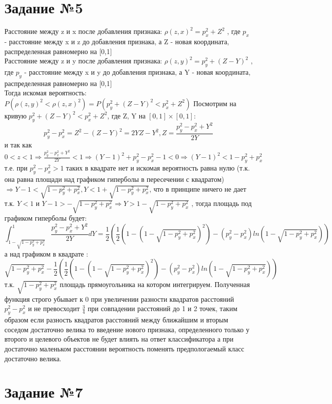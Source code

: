 \documentclass[12pt,a4paper,oneside]{scrartcl}
\begin{document}
\section{Задание №5}
Расстояние между z и x после добавления признака: 
$\rho(z, x)^2 = p_x^2 + Z^2$ , где $p_x$ - расстояние между x и z до добавления признака, а Z - новая координата, распределенная равномерно на [0,1] \\ 
Расстояние между z и y после добавления признака: 
$\rho(z, y)^2 = p_y^2 + (Z - Y)^2$ , где $p_y$ - расстояние между x и y до добавления признака, а Y - новая координата, распределенная равномерно на [0,1] \\ 
Тогда искомая вероятность: $P(\rho(z, y)^2 < \rho(z, x)^2) = P(p_y^2 + (Z - Y)^2 < p_x^2 + Z^2)$
Посмотрим на кривую $p_y^2 + (Z - Y)^2 < p_x^2 + Z^2$, где Z, Y на $[0, 1] \times [0,1]$:
$$p_y^2 - p_x^2 = Z^2 - (Z - Y)^2 = 2YZ - Y^2, Z = \frac{p_y^2 - p_x^2 + Y^2}{2Y}$$ и так как $0 < z < 1 \Rightarrow \frac{p_y^2 - p_x^2 + Y^2}{2Y} < 1 \Rightarrow (Y - 1)^2 + p_y^2 - p_x^2 - 1 < 0 \Rightarrow (Y - 1)^2 < 1 - p_y^2 + p_x^2$ т.е. при $p_y^2 - p_x^2 > 1 $ таких в квадрате нет и искомая вероятность равна нулю (т.к. она равна площади над графиком гиперболы в пересечении с квадратом) $ \Rightarrow Y - 1 < \sqrt{1 - p_y^2 + p_x^2}, Y < 1 + \sqrt{1 - p_y^2 + p_x^2} $, что в принципе ничего не дает т.к. $ Y < 1$ и $Y - 1 > - \sqrt{1 - p_y^2 + p_x^2} \Rightarrow Y > 1 - \sqrt{1 - p_y^2 + p_x^2}$ , тогда площадь под графиком гиперболы будет: $$\int_{1 - \sqrt{1 - p_y^2 + p_x^2}}^1  \frac{p_y^2 - p_x^2 + Y^2}{2Y} dY = \frac{1}{2}(\frac{1}{2}(1 - (1 - \sqrt{1 - p_y^2 + p_x^2})^2) - (p_y^2 - p_x^2)ln(1 - \sqrt{1 - p_y^2 + p_x^2}))$$ а над графиком в квадрате :$$\sqrt{1 - p_y^2 + p_x^2} - \frac{1}{2}(\frac{1}{2}(1 - (1 - \sqrt{1 - p_y^2 + p_x^2})^2) - (p_y^2 - p_x^2)ln(1 - \sqrt{1 - p_y^2 + p_x^2}))$$ т.к. $\sqrt{1 - p_y^2 + p_x^2}$ площадь прямоугольника на котором интегрируем. Полученная функция строго убывает к 0 при увеличении разности квадратов расстояний $p_y^2 - p_x^2$ и не превосходит $\frac{3}{4}$ при совпадении расстояний до 1 и 2 точек, таким образом если разность квадратов расстояний между ближайшим и вторым соседом достаточно велика то введение нового признака, определенного только у второго и целевого объектов не будет влиять на ответ классификатора а при достаточно маленьком расстоянии вероятность поменять предпологаемый класс достаточно велика.


\section{Задание №7}
\end{document}

